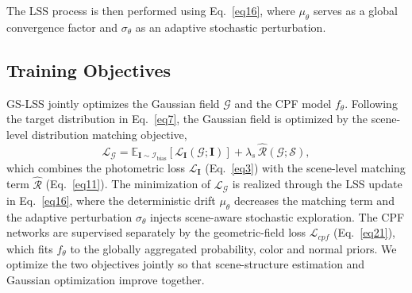 \documentclass[lettersize,journal]{IEEEtran}
\begin{document}
The LSS process is then performed using Eq.~\ref{eq16}, where $\mu_{\theta}$ serves as a global convergence factor and $\sigma_{\theta}$ as an adaptive stochastic perturbation.  


\subsection{Training Objectives}

GS-LSS jointly optimizes the Gaussian field $\mathcal{G}$ and the CPF model $f_{\theta}$. Following the target distribution in Eq.~\ref{eq7}, the Gaussian field is optimized by the scene-level distribution matching objective,
\begin{equation}
    \mathcal{L}_{\mathcal{G}} = \mathbb{E}_{\mathbf{I} \sim \mathcal{I}_{\text{bias}}} \left[ \mathcal{L}_{\mathbf{I}}(\mathcal{G};\mathbf{I}) \right] + \lambda_{s} \, \widehat{\mathcal{R}}(\mathcal{G};\mathcal{S}),
    \label{eq26}
\end{equation}
which combines the photometric loss $\mathcal{L}_{\mathbf{I}}$ (Eq.~\ref{eq3}) with the scene-level matching term $\widehat{\mathcal{R}}$ (Eq.~\ref{eq11}). The minimization of $\mathcal{L}_{\mathcal{G}}$ is realized through the LSS update in Eq.~\ref{eq16}, where the deterministic drift $\mu_{\theta}$ decreases the matching term and the adaptive perturbation $\sigma_{\theta}$ injects scene-aware stochastic exploration. The CPF networks are supervised separately by the geometric-field loss $\mathcal{L}_{cpf}$ (Eq.~\ref{eq21}), which fits $f_{\theta}$ to the globally aggregated probability, color and normal priors. 
We optimize the two objectives jointly so that scene-structure estimation and Gaussian optimization improve together.
    
\end{document}
